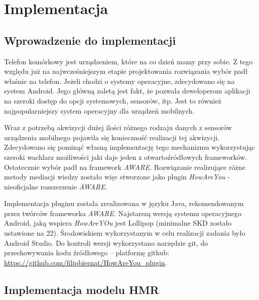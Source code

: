 \chapter{Implementacja}
\label{cha:implementacja}


\section{Wprowadzenie do implementacji}
\label{sec:wprowadzenieDoImplementacji}

Telefon komórkowy jest urządzeniem, które na co dzień mamy przy sobie. Z tego względu już na najwcześniejszym etapie projektowania rozwiązania wybór padł właśnie na telefon. Jeżeli chodzi o systemy operacyjne, zdecydowano się na system Android. Jego główną zaletą jest fakt, że pozwala deweloperom aplikacji na szeroki dostęp do opcji systemowych, sensorów, itp. Jest to również najpopularniejszy system operacyjny dla urządzeń mobilnych.

Wraz z potrzebą akwizycji dużej ilości różnego rodzaju danych z sensorów urządzenia mobilnego pojawiła się konieczność realizacji tej akwizycji. Zdecydowano się pominąć własną implementację tego mechanizmu wykorzystując szeroki wachlarz możliwości jaki daje jeden z otwartoźródłowych frameworków. Ostatecznie wybór padł na framework \textit{AWARE}. Rozwiązanie realizujące różne metody mediacji wiedzy zostało więc stworzone jako plugin \textit{HowAreYou} - nieoficjalne rozszerzenie \textit{AWARE}.

Implementacja pluginu została zrealizowana w języku Java, rekomendowanym przez twórców frameworka \textit{AWARE}\cite{AwareFramework}. Najstarszą wersją systemu operacyjnego Android, jaką wspiera \textit{HowAreYOu} jest Lollipop (minimalne SKD zostało ustawione na 22). Środowiskiem wykorzystanym w celu realizacji zadania było Android Studio. Do kontroli wersji wykorzystano narzędzie git, do przechowywania kodu źródłowego -- platformę github: \url{https://github.com/filipbiernat/HowAreYou_plugin}.


\section{Implementacja modelu HMR}
\label{sec:implementacjaModeluHmr}

